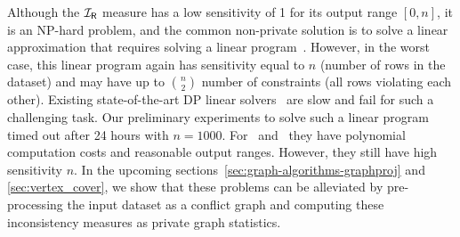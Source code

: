 Although the $\mathcal{I_\mathsf{R}}$ measure has a low sensitivity of 1 for its output range $[0,n]$, it is an NP-hard problem, and the common non-private solution
is to solve a linear approximation that requires solving a linear program~\cite{LivshitsBKS20}. However, in the worst case, this linear program again has sensitivity equal to $n$ (number of rows in the dataset) and may have up to $\binom n2$ number of constraints (all rows violating each other). Existing state-of-the-art DP linear solvers~\cite{hsu2014privately} are slow and fail for such a challenging task. Our preliminary experiments to solve such a linear program timed out after 24 hours with $n=1000$.
For \mininconsistency\ and \problematic\, they have polynomial computation costs and reasonable output ranges. However, they still have high sensitivity $n$. In the upcoming sections~\ref{sec:graph-algorithms-graphproj} and \ref{sec:vertex_cover}, we show that these problems can be alleviated by pre-processing the input dataset as a conflict graph and computing these inconsistency measures as private graph statistics. 

